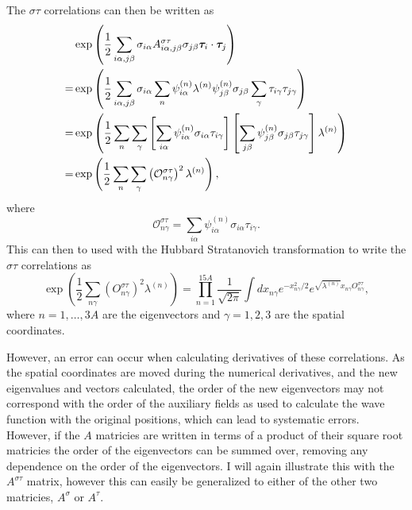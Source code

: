 The $\sigma\tau$ correlations can then be written as
\begin{align}
   &\exp\left(\frac{1}{2}\sum\limits_{i\alpha,j\beta} \sigma_{i\alpha}A^{\sigma\tau}_{i\alpha,j\beta}\sigma_{j\beta}\bm{\tau}_i\cdot\bm{\tau}_j\right) \\
   =& \exp\left(\frac{1}{2}\sum\limits_{i\alpha,j\beta} \sigma_{i\alpha}\sum\limits_n \psi^{(n)}_{i\alpha}\lambda^{(n)}\psi^{(n)}_{j\beta}\sigma_{j\beta}\sum\limits_\gamma\tau_{i\gamma}\tau_{j\gamma}\right) \\
   =& \exp\left(\frac{1}{2}\sum\limits_n\sum\limits_\gamma\left[\sum\limits_{i\alpha} \psi^{(n)}_{i\alpha}\sigma_{i\alpha}\tau_{i\gamma}\right] \left[\sum\limits_{j\beta}\psi^{(n)}_{j\beta}\sigma_{j\beta}\tau_{j\gamma}\right] \lambda^{(n)}\right) \\
   =& \exp\left(\frac{1}{2}\sum\limits_n\sum\limits_\gamma\left(\mathcal{O}^{\sigma\tau}_{n\gamma}\right)^2 \lambda^{(n)}\right),
\end{align}
where
\begin{equation}
   \mathcal{O}^{\sigma\tau}_{n\gamma} = \sum\limits_{i\alpha} \psi^{(n)}_{i\alpha}\sigma_{i\alpha}\tau_{i\gamma}.
\end{equation}
This can then to used with the Hubbard Stratanovich transformation to write the $\sigma\tau$ correlations as
\begin{equation}
   \exp\left(\frac{1}{2}\sum\limits_{n\gamma} \left(O^{\sigma\tau}_{n\gamma}\right)^2 \lambda^{(n)}\right) = \prod\limits_{n=1}^{15A} \frac{1}{\sqrt{2\pi}}\int dx_{n\gamma} e^{-x_{n\gamma}^2/2}e^{\sqrt{\lambda^{(n)}}x_{n\gamma}O_{n\gamma}^{\sigma\tau}},
\end{equation}
where $n=1,\ldots,3A$ are the eigenvectors and $\gamma=1,2,3$ are the spatial coordinates.

However, an error can occur when calculating derivatives of these correlations. As the spatial coordinates are moved during the numerical derivatives, and the new eigenvalues and vectors calculated, the order of the new eigenvectors may not correspond with the order of the auxiliary fields as used to calculate the wave function with the original positions, which can lead to systematic errors. However, if the $A$ matricies are written in terms of a product of their square root matricies the order of the eigenvectors can be summed over, removing any dependence on the order of the eigenvectors. I will again illustrate this with the $A^{\sigma\tau}$ matrix, however this can easily be generalized to either of the other two matricies, $A^\sigma$ or $A^\tau$.

